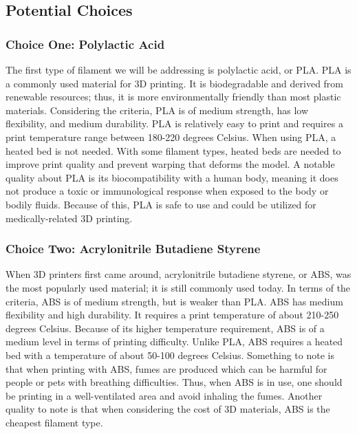 \documentclass[letterpaper, onecolumn, draftclsnofoot,10pt, compsoc]{IEEEtran}
\begin{document}
\subsection{Potential Choices}
\subsubsection{Choice One: Polylactic Acid}
The first type of filament we will be addressing is polylactic acid, or PLA. 
PLA is a commonly used material for 3D printing. 
It is biodegradable and derived from renewable resources; thus, it is more environmentally friendly than most plastic materials. 
Considering the criteria, PLA is of medium strength, has low flexibility, and medium durability. 
PLA is relatively easy to print and requires a print temperature range between 180-220 degrees Celsius.  
When using PLA, a heated bed is not needed. 
With some filament types, heated beds are needed to improve print quality and prevent warping that deforms the model.\cite{heatbedweb}
A notable quality about PLA is its biocompatibility with a human body, meaning it does not produce a toxic or immunological response when exposed to the body or bodily fluids.
Because of this, PLA is safe to use and could be utilized for medically-related 3D printing. \cite{filamentweb}
\subsubsection{Choice Two: Acrylonitrile Butadiene Styrene}
When 3D printers first came around, acrylonitrile butadiene styrene, or ABS, was the most popularly used material; it is still commonly used today. 
In terms of the criteria, ABS is of medium strength, but is weaker than PLA.
ABS has medium flexibility and high durability.
It requires a print temperature of about 210-250 degrees Celsius.
Because of its higher temperature requirement, ABS is of a medium level in terms of printing difficulty. 
Unlike PLA, ABS requires a heated bed with a temperature of about 50-100 degrees Celsius.
Something to note is that when printing with ABS, fumes are produced which can be harmful for people or pets with breathing difficulties.
Thus, when ABS is in use, one should be printing in a well-ventilated area and avoid inhaling the fumes. 
Another quality to note is that when considering the cost of 3D materials, ABS is the cheapest filament type. \cite{filamentweb}
\end{document}
